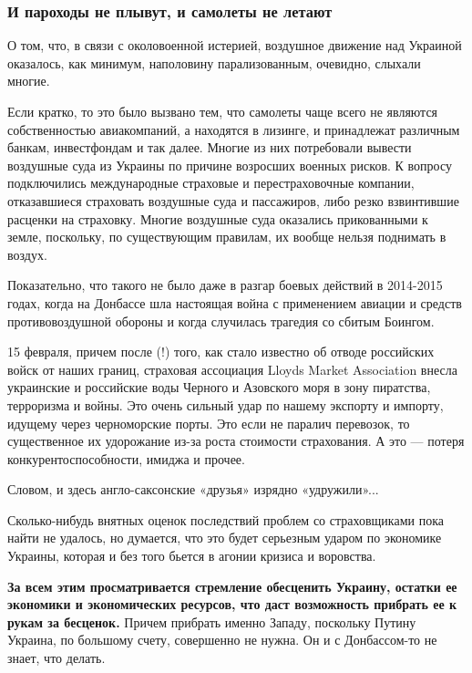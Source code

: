  
 
 
 
 

\subsubsection{И пароходы не плывут, и самолеты не летают}
\label{sec:17_02_2022.stz.news.ua.fraza.1.kak_zapadnyje_partnery_opuskajut_ukrainu.4.parohody_samolety}

О том, что, в связи с околовоенной истерией, воздушное движение над Украиной
оказалось, как минимум, наполовину парализованным, очевидно, слыхали многие.

Если кратко, то это было вызвано тем, что самолеты чаще всего не являются
собственностью авиакомпаний, а находятся в лизинге, и принадлежат различным
банкам, инвестфондам и так далее. Многие из них потребовали вывести воздушные
суда из Украины по причине возросших военных рисков. К вопросу подключились
международные страховые и перестраховочные компании, отказавшиеся страховать
воздушные суда и пассажиров, либо резко взвинтившие расценки на страховку.
Многие воздушные суда оказались прикованными к земле, поскольку, по
существующим правилам, их вообще нельзя поднимать в воздух.

Показательно, что такого не было даже в разгар боевых действий в 2014-2015
годах, когда на Донбассе шла настоящая война с применением авиации и средств
противовоздушной обороны и когда случилась трагедия со сбитым Боингом.

15 февраля, причем после (!) того, как стало известно об отводе российских
войск от наших границ, страховая ассоциация Lloyds Market Association внесла
украинские и российские воды Черного и Азовского моря в зону пиратства,
терроризма и войны. Это очень сильный удар по нашему экспорту и импорту,
идущему через черноморские порты. Это если не паралич перевозок, то
существенное их удорожание из-за роста стоимости страхования. А это — потеря
конкурентоспособности, имиджа и прочее.

Словом, и здесь англо-саксонские «друзья» изрядно «удружили»...

Сколько-нибудь внятных оценок последствий проблем со страховщиками пока найти
не удалось, но думается, что это будет серьезным ударом по экономике Украины,
которая и без того бьется в агонии кризиса и воровства.

\textbf{За всем этим просматривается стремление обесценить Украину, остатки ее
экономики и экономических ресурсов, что даст возможность прибрать ее к рукам за
бесценок.} Причем прибрать именно Западу, поскольку Путину Украина, по большому
счету, совершенно не нужна. Он и с Донбассом-то не знает, что делать.

